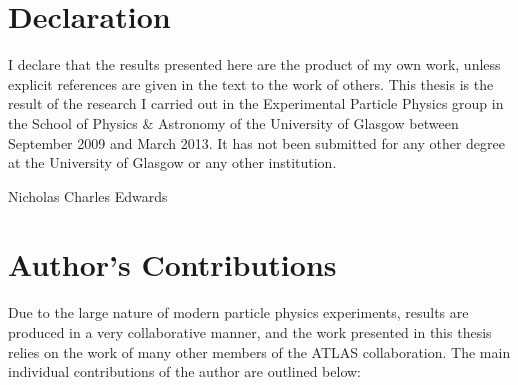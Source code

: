 \chapter*{Declaration}
I declare that the results presented here are the product of my own work, unless
explicit references are given in the text to the work of others. This thesis is
the result of the research I carried out in the Experimental Particle Physics
group in the School of Physics \& Astronomy of the University of Glasgow between
September 2009 and March 2013. It has not been submitted for any other degree
at the University of Glasgow or any other institution.

\hfill Nicholas Charles Edwards

\chapter*{Author's Contributions}

Due to the large nature of modern particle physics experiments, results are produced in a very collaborative
manner, and the work presented in this thesis relies on the work of many other
members of the ATLAS collaboration.
The main individual contributions of the author are outlined below:


